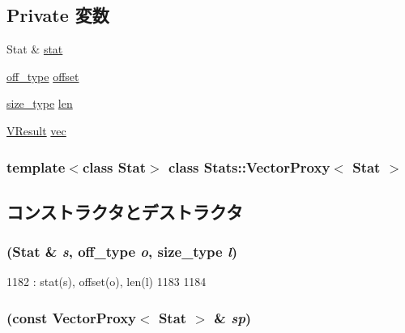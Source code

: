 \subsection*{Private 変数}
\begin{DoxyCompactItemize}
\item 
Stat \& \hyperlink{classStats_1_1VectorProxy_a7fee3822515c4dc6b8b99a8bf35fa6b8}{stat}
\item 
\hyperlink{namespaceStats_a2773c9fa9e4b0b04a46b37494b44842a}{off\_\-type} \hyperlink{classStats_1_1VectorProxy_ae28be34e3b236f2519b5af71539a66d9}{offset}
\item 
\hyperlink{namespaceStats_ada51e68d31936547d3729c82daf6b7c6}{size\_\-type} \hyperlink{classStats_1_1VectorProxy_a5957358d37d75723f57301e98a6c53ce}{len}
\item 
\hyperlink{classstd_1_1vector}{VResult} \hyperlink{classStats_1_1VectorProxy_a539785a2cf8aa37d52a6023051f9f797}{vec}
\end{DoxyCompactItemize}
\subsubsection*{template$<$class Stat$>$ class Stats::VectorProxy$<$ Stat $>$}



\subsection{コンストラクタとデストラクタ}
\hypertarget{classStats_1_1VectorProxy_a27a05786f526f097649c11fe5b72de8c}{
\subsubsection[{VectorProxy}]{ (Stat \& {\em s}, \/  {\bf off\_\-type} {\em o}, \/  {\bf size\_\-type} {\em l})}}
\label{classStats_1_1VectorProxy_a27a05786f526f097649c11fe5b72de8c}



\begin{DoxyCode}
1182         : stat(s), offset(o), len(l)
1183     {
1184     }
\end{DoxyCode}
\hypertarget{classStats_1_1VectorProxy_a12e67607e22ed562025db26ee351b370}{
\subsubsection[{VectorProxy}]{ (const {\bf VectorProxy}$<$ Stat $>$ \& {\em sp})}}
\label{classStats_1_1VectorProxy_a12e67607e22ed562025db26ee351b370}



